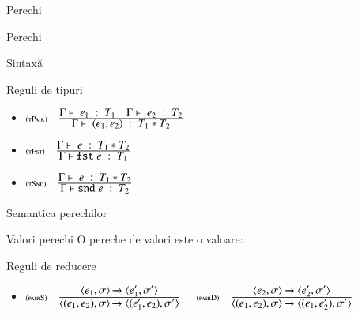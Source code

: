 \documentclass[xcolor=pdftex,romanian,colorlinks]{beamer}
\begin{document}
\begin{section}{Perechi}
\begin{frame}{Perechi}
\begin{block}{Sintaxă}
\end{block}
\begin{block}{Reguli de tipuri}
\begin{itemize}
\item[] 
$\reg[tPair]{\tjud{(e_1,e_2)}{T_1 * T_2}}{\tjud{e_1}{T_1}{}\si \tjud{e_2}{T_2}{}}{}$
\item[] $\reg[tFst]{\tjud{\terminal{fst} e}{T_1}}{\tjud{e}{T_1 * T_2}{}}{}$
\item[]
$\reg[tSnd]{\tjud{\terminal{snd} e}{T_2}}{\tjud{e}{T_1 * T_2}{}}{}$

\end{itemize}

\end{block}
\end{frame}

\begin{frame}{Semantica perechilor}
\begin{block}{Valori perechi}
O pereche de valori este o valoare:
\end{block}
\begin{block}{Reguli de reducere}
\begin{itemize}
\item[] {\small $\reg[pairS]{\Ss{\c{(e_1,e_2),\sigma}}{\c{(e_1',e_2),\sigma'}}}{\Ss{\c{e_1,\sigma}}{\c{e_1',\sigma'}}}{}$ 
\hfill $\reg[pairD]{\Ss{\c{(e_1,e_2),\sigma}}{\c{(e_1,e_2'),\sigma'}}}{\Ss{\c{e_2,\sigma}}{\c{e_2',\sigma'}}}{}$}


\end{itemize}
\end{block}
\end{frame}
\end{section}
\end{document}
